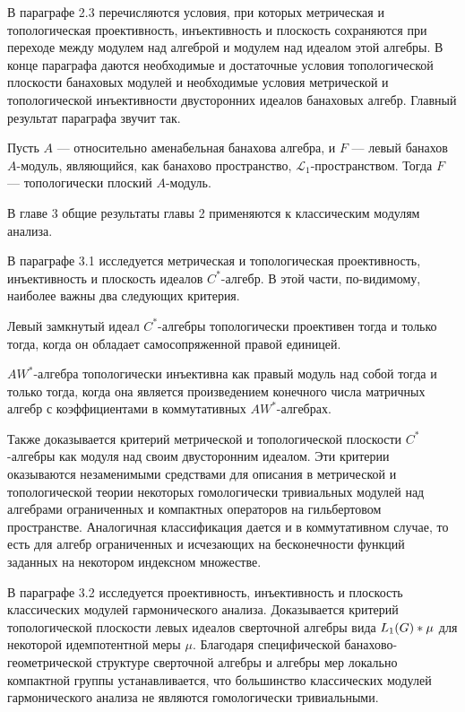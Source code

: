 В параграфе 2.3 перечисляются условия, при которых метрическая и топологическая
проективность, инъективность и плоскость сохраняются при переходе между модулем
над алгеброй и модулем над идеалом этой алгебры. В конце параграфа даются
необходимые и достаточные условия топологической плоскости банаховых модулей и
необходимые условия метрической и топологической инъективности двусторонних
идеалов банаховых алгебр. Главный результат параграфа звучит так.

\begin{theorem*}[2.3.9] Пусть $A$ --- относительно аменабельная банахова
    алгебра, и $F$ --- левый банахов $A$-модуль, являющийся, как банахово
    пространство, $\mathscr{L}_1$-пространством. Тогда $F$ --- топологически плоский
    $A$-модуль.
\end{theorem*}

В главе 3 общие результаты главы 2 применяются к классическим модулям анализа.

В параграфе 3.1 исследуется метрическая и топологическая проективность,
инъективность и плоскость идеалов $C^*$-алгебр. В этой части, по-видимому,
наиболее важны два следующих критерия.

\begin{theorem*}[3.1.4] Левый замкнутый идеал $C^*$-алгебры топологически
    проективен тогда и только тогда, когда он обладает самосопряженной правой
    единицей.
\end{theorem*}

\begin{theorem*}[3.1.11] $AW^*$-алгебра топологически инъективна как правый
    модуль над собой тогда и только тогда, когда она является произведением
    конечного числа матричных алгебр с коэффициентами в коммутативных
    $AW^*$-алгебрах.
\end{theorem*}

Также доказывается критерий метрической и топологической плоскости $C^*$-алгебры
как модуля над своим двусторонним идеалом. Эти критерии оказываются незаменимыми
средствами для описания в метрической и топологической теории некоторых
гомологически тривиальных модулей над алгебрами ограниченных и компактных
операторов на гильбертовом пространстве. Аналогичная классификация дается и в
коммутативном случае, то есть для алгебр ограниченных и исчезающих на
бесконечности функций заданных на некотором индексном множестве.

В параграфе 3.2 исследуется проективность, инъективность и плоскость
классических модулей гармонического анализа. Доказывается критерий
топологической плоскости левых идеалов сверточной алгебры вида
$L_1(G)\ast\mu$ для некоторой идемпотентной меры $\mu$. Благодаря
специфической банахово-геометрической структуре сверточной алгебры и алгебры мер
локально компактной группы устанавливается, что большинство классических модулей
гармонического анализа не являются гомологически тривиальными.

